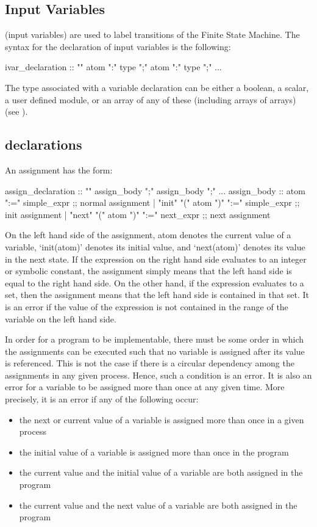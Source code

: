 \subsection{Input Variables}
\label{input variables}
%
 (input variables) are used to label transitions of the Finite
State Machine.  The syntax for the declaration of input variables is
the following:
%
\begin{Grammar}
ivar_declaration :: ""
             atom ":" type ";"
             atom ":" type ";"
             ...
\end{Grammar}
%
The type associated with a variable declaration can be either a
boolean, a scalar, a user defined module, or an array of any of these
(including arrays of arrays) (see ).

\subsection{ declarations}
\label{ASSIGN declarations}
%
An assignment  has the form:
%
\begin{Grammar}
assign_declaration :: ""
           assign_body ";"
           assign_body ";"
           ...
assign_body ::
    atom                ":=" simple_expr     ;; normal assignment
  | "init" "(" atom ")" ":=" simple_expr     ;; init assignment
  | "next" "(" atom ")" ":=" next_expr       ;; next assignment
\end{Grammar}
%
On the left hand side of the assignment, atom denotes the current
value of a variable, `init(atom)' denotes its initial value, and
`next(atom)' denotes its value in the next state.  If the expression
on the right hand side evaluates to an integer or symbolic constant,
the assignment simply means that the left hand side is equal to the
right hand side.  On the other hand, if the expression evaluates to a
set, then the assignment means that the left hand side is contained in
that set. It is an error if the value of the expression is not
contained in the range of the variable on the left hand side.

In order for a program to be implementable, there must be some order
in which the assignments can be executed such that no variable is
assigned after its value is referenced. This is not the case if there
is a circular dependency among the assignments in any given
process. Hence, such a condition is an error. It is also an error for
a variable to be assigned more than once at any given time. More
precisely, it is an error if any of the following occur:
%
\begin{itemize}
\item the next or current value of a variable is assigned more than once
      in a given process
\item the initial value of a variable is assigned more than once in the
      program
\item the current value and the initial value of a variable are both
      assigned in the program
\item the current value and the next value of a variable are both
      assigned in the program
\end{itemize}

